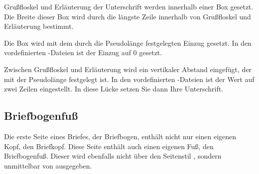 \begin{Declaration}
\end{Declaration}
Grußfloskel und Erläuterung der
Unterschrift werden innerhalb einer Box gesetzt.  Die
Breite dieser Box wird durch die längste Zeile innerhalb von Grußfloskel und
Erläuterung bestimmt.

Die Box wird mit dem durch die Pseudolänge  festgelegten
Einzug gesetzt. In den vordefinierten
-Dateien ist der Einzug auf 0 gesetzt.

Zwischen Grußfloskel und Erläuterung wird ein vertikaler Abstand eingefügt,
der mit der Pseudolänge  festgelegt ist. In den
vordefinierten -Dateien ist der Wert auf
zwei Zeilen eingestellt. In diese Lücke setzen Sie dann Ihre Unterschrift.%
%
\EndIndexGroup
%
\EndIndexGroup


\subsection{Briefbogenfuß}
%
\BeginIndexGroup
{}%

Die erste Seite eines Briefes, der Briefbogen, enthält nicht nur einen eigenen
Kopf, den Briefkopf. Diese Seite enthält auch einen eigenen
Fuß, den Briefbogenfuß. %
\iftrue%
Dieser wird ebenfalls nicht über den Seitenstil%
\else%
Genau wie der Briefkopf wird der Briefbogenfuß nicht über den Seitenstil%
\fi%
, sondern unmittelbar von %
 ausgegeben.


